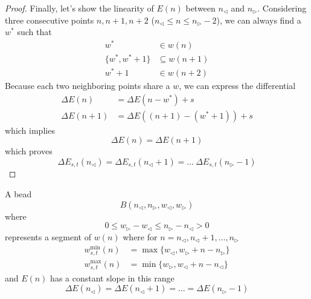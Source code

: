 \documentclass[]{article}
\begin{document}
\begin{proof}
	Finally, let's show the linearity of $E(n)$ between $n_{\triangleleft}$ and $n_{\triangleright}$. Considering three consecutive points $n, n+1, n+2$ ($n_{\triangleleft} \le n \le n_{\triangleright} - 2$), we can always find a $w^*$ such that
	\begin{align*}
	w^* &\in w(n)\\
	\{w^*, w^*+1\} &\subseteq w(n+1)\\
	w^*+1 &\in w(n+2)
	\end{align*}
	Because each two neighboring points share a $w$, we can express the differential
	\begin{align*}
	\Delta E(n) &= \Delta E(n - w^*) + s\\
	\Delta E(n+1) &= \Delta E((n+1) - (w^*+1)) + s
	\end{align*}
	which implies
	\[
	\Delta E(n) = \Delta E(n+1)
	\]
	which proves
	\[
	\Delta E_{s,t}(n_{\triangleleft}) = \Delta E_{s,t}(n_{\triangleleft} + 1) = \dots \ \Delta E_{s,t}(n_{\triangleright} - 1)
	\]

\end{proof}

\vspace{1cm}
\begin{definition}[Beads]
	A bead 
	\[
	B(n_{\triangleleft}, n_{\triangleright}, w_{\triangleleft}, w_{\triangleright})
	\] 
	where 
	\[
	0 \le w_{\triangleright} - w_{\triangleleft} \le  n_{\triangleright} - n_{\triangleleft} > 0
	\]
	represents a segment of $w(n)$ where for $n = n_{\triangleleft}, n_{\triangleleft}+1,\dots,n_{\triangleright}$
	\begin{align*}
		w^{\min}_{s,t}(n) &= \max\{w_{\triangleleft}, w_{\triangleright} + n - n_{\triangleright}\}\\
		w^{\max}_{s,t}(n) &= \min\{w_{\triangleright}, w_{\triangleleft} + n - n_{\triangleleft}\}
	\end{align*}
	and $E(n)$ has a constant slope in this range
	\[
	\Delta E(n_{\triangleleft}) = \Delta E(n_{\triangleleft} + 1) = \dots = \Delta E(n_{\triangleright} - 1)
	\]
\end{definition}
\end{document}
